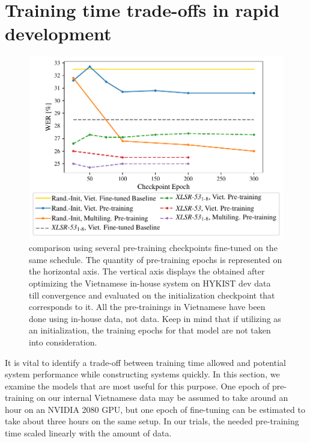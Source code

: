 \section{Training time trade-offs in rapid development}

\begin{figure}[hbtp]
	\centering
	\includegraphics[width=1.0\textwidth]{figures/pretrain_comparison.pdf}
	\caption{
	     comparison using several pre-training checkpoints fine-tuned on the same schedule. 
	    The quantity of pre-training epochs is represented on the horizontal axis. 
	    The vertical axis displays the  obtained after optimizing the Vietnamese in-house system on HYKIST dev data till convergence and evaluated on the initialization checkpoint that corresponds to it. 
	    All the pre-trainings in Vietnamese have been done using in-house data, not  data. 
	    Keep in mind that if utilizing as an initialization, the training epochs for that model are not taken into consideration.
	    }
	\label{fig:fine_tune_comp_joint}
\end{figure}

It is vital to identify a trade-off between training time allowed and potential system performance while constructing  systems quickly. 
In this section, we examine the models that are most useful for this purpose. 
One epoch of pre-training on our internal Vietnamese data may be assumed to take around an hour on an NVIDIA 2080 GPU, but one epoch of fine-tuning can be estimated to take about three hours on the same setup. 
In our trials, the needed pre-training time scaled linearly with the amount of data.


